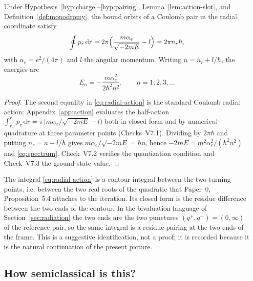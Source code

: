 \begin{theorem}
\label{thm:spectrum}
Under Hypothesis~\ref{hyp:charge}--\ref{hyp:pairing}, Lemma~\ref{lem:action-slot},
and Definition~\ref{def:monodromy}, the bound orbits of a Coulomb pair in the
radial coordinate satisfy
\begin{equation}\label{eq:radial-action}
  \oint p_r\,\mathrm dr
  =2\pi\Bigl(\frac{m\alpha_e}{\sqrt{-2mE}}-l\Bigr)=2\pi n_r\hbar ,
\end{equation}
with $\alpha_e=e^{2}/(4\pi)$ and $l$ the angular momentum.  Writing
$n=n_r+l/\hbar$, the energies are
\begin{equation}\label{eq:spectrum}
  E_n=-\frac{m\alpha_e^{2}}{2\hbar^{2}n^{2}},
  \qquad n=1,2,3,\dots
\end{equation}
\end{theorem}

\begin{proof}
The second equality in \eqref{eq:radial-action} is the standard Coulomb radial
action; Appendix~\ref{app:action} evaluates the half-action
$\int_{r_-}^{r_+}p_r\,\mathrm dr=\pi\bigl(m\alpha_e/\sqrt{-2mE}-l\bigr)$ both
in closed form and by numerical quadrature at three parameter points
(Checks~V7.1).  Dividing by $2\pi\hbar$ and putting $n_r=n-l/\hbar$ gives
$m\alpha_e/\sqrt{-2mE}=\hbar n$, hence $-2mE=m^{2}\alpha_e^{2}/(\hbar^{2}n^{2})$
and \eqref{eq:spectrum}.  Check~V7.2 verifies the quantization condition and
Check~V7.3 the ground-state value.
\end{proof}

\begin{remark}
\label{rem:residue}
The integral \eqref{eq:radial-action} is a contour integral between the two
turning points, i.e. between the two real roots of the quadratic that Paper~0,
Proposition~5.4 attaches to the iteration.  Its closed form is the residue
difference between the two ends of the contour.  In the bivaluation language of
Section~\ref{sec:radiation} the two ends are the two punctures
$(q^+,q^-)=(0,\infty)$ of the reference pair, so the same integral is a residue
pairing at the two ends of the frame.  This is a suggestive identification, not a
proof; it is recorded because it is the natural continuation of the present
picture.
\end{remark}

\subsection{How semiclassical is this?}

